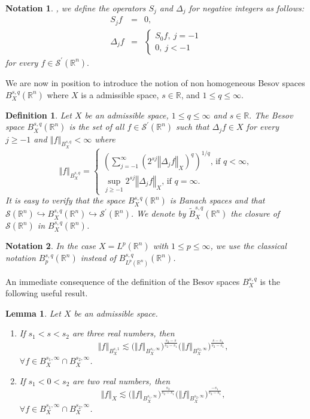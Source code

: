 \documentclass[11pt]{amsart}%
\theoremstyle{plain}
\numberwithin{equation}{section}
\newtheorem{lemma}{Lemma}[section]
\newtheorem{definition}{Definition}[section]
\newtheorem{notation}{Notation}
\begin{document}
\begin{notation}, we define the operators $S_{j}$ and $%
\Delta _{j}$ for negative integers as follows:%
\begin{eqnarray*}
S_{j}f &=&0, \\
\Delta _{j}f &=&\left\{
\begin{array}{l}
S_{0}f,~j=-1 \\
0,~j<-1%
\end{array}%
\right.
\end{eqnarray*}%
for every $f\in \mathcal{S}^{\prime }(\mathbb{R}^{n}).$
\end{notation}
We are now in position to introduce the notion of non homogeneous Besov spaces $B_{X}^{s,q}(\mathbb{R}^{n})$ where $X$ is a admissible space, $s\in\mathbb{R}$, and $1\leq q\leq\infty$.
\begin{definition}
Let $X$ be an admissible space, $1\leq q\leq \infty $ and $s\in \mathbb{R}.$ The
Besov space $B_{X}^{s,q}(\mathbb{R}^{n})$ is the set of all $f\in \mathcal{S}^{\prime
}(\mathbb{R}^{n})$ such that $\Delta _{j}f\in X$ for every $j\geq -1$ and $%
\left\Vert f\right\Vert _{B_{X}^{s,q}}<\infty $ where
\[
\left\Vert f\right\Vert _{B_{X}^{s,q}}=\left\{
\begin{array}{l}
\left( \sum_{j=-1}^{\infty }\left( 2^{sj}\left\Vert \Delta _{j}f\right\Vert
_{X}\right) ^{q}\right) ^{1/q}\text{, if }q<\infty , \\
\sup_{j\geq -1}2^{sj}\left\Vert \Delta _{j}f\right\Vert _{X}\text{, if }%
q=\infty .%
\end{array}%
\right.
\]
It is easy to verify that the space $B_{X}^{s,q}(\mathbb{R}^{n})$ is Banach spaces and that $\mathcal{S}(\mathbb{R}^{n})\hookrightarrow B_{X}^{s,q}(\mathbb{R}^{n})\hookrightarrow \mathcal{S}^\prime(\mathbb{R}^{n})$.
We denote by $\tilde{B}_{X}^{s,q}(\mathbb{R}^{n})$ the closure of $\mathcal{S}(\mathbb{R}^n)$ in $B_{X}^{s,q}(\mathbb{R}^{n})$.
\end{definition}
\begin{notation}
In the case $X=L^p(\mathbb{R}^n)$ with $1\leq p\leq\infty$, we use the classical notation $B_{p}^{s,q}(\mathbb{R}^{n})$ instead of $B_{L^p(\mathbb{R}^n)}^{s,q}(\mathbb{R}^{n})$.
\end{notation}
An immediate consequence of the definition of the Besov spaces $ B_{X}^{s,q}$ is the following useful result.
\begin{lemma}\label{interp}
Let $X$ be an admissible space.
\begin{enumerate}
    \item If $s_1<s<s_2$ are three real numbers, then
    $$ \left\Vert f\right\Vert _{B_{X}^{s,1}}\lesssim \big(\left\Vert f\right\Vert_{B_{X}^{s_1,\infty}}\big)^{\frac{s_2-s}{s_2-s_1}}\big(\left\Vert f\right\Vert_{B_{X}^{s_2,\infty}}\big)^{\frac{s-s_1}{s_2-s_1}}, $$
$\forall f\in B_{X}^{s_1,\infty}\cap B_{X}^{s_2,\infty}$.
\item If $s_1<0<s_2$ are two real numbers, then
    $$ \left\Vert f\right\Vert _X\lesssim \big(\left\Vert f\right\Vert_{B_{X}^{s_1,\infty}}\big)^{\frac{s_2}{s_2-s_1}}\big(\left\Vert f\right\Vert_{B_{X}^{s_2,\infty}}\big)^{\frac{-s_1}{s_2-s_1}}, $$
$\forall f\in B_{X}^{s_1,\infty}\cap B_{X}^{s_2,\infty}$.
\end{enumerate}
\end{lemma}
\end{document}
